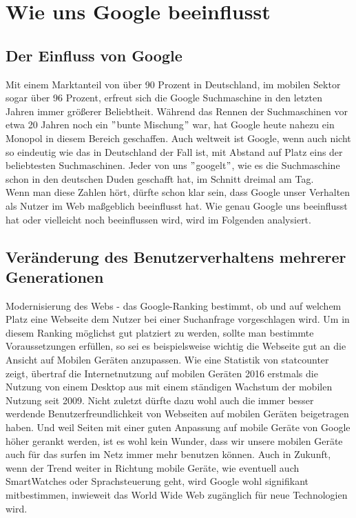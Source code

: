 \section{Wie uns Google beeinflusst}\label{sec:wie-uns-google-beeinflusst}

\subsection{Der Einfluss von Google}\label{subsec:der-einfluss-von-google}
Mit einem Marktanteil von über 90 Prozent in Deutschland, im mobilen Sektor sogar über 96 Prozent, erfreut sich die Google Suchmaschine in den letzten Jahren immer größerer Beliebtheit.
Während das Rennen der Suchmaschinen vor etwa 20 Jahren noch ein \("\)bunte Mischung\("\) war, hat Google heute nahezu ein Monopol in diesem Bereich geschaffen.
Auch weltweit ist Google, wenn auch nicht so eindeutig wie das in Deutschland der Fall ist, mit Abstand auf Platz eins der beliebtesten Suchmaschinen.
Jeder von uns \("\)googelt\("\)\cite{DUD22}, wie es die Suchmaschine schon in den deutschen Duden geschafft hat, im Schnitt dreimal am Tag.\cite{DOL22}\\
Wenn man diese Zahlen hört, dürfte schon klar sein, dass Google unser Verhalten als Nutzer im Web maßgeblich beeinflusst hat.
Wie genau Google uns beeinflusst hat oder vielleicht noch beeinflussen wird, wird im Folgenden analysiert.

\subsection{Veränderung des Benutzerverhaltens mehrerer Generationen}\label{subsec:veränderung-des-benutzerverhaltens-mehrerer-generationen}
Modernisierung des Webs - das Google-Ranking bestimmt, ob und auf welchem Platz eine Webseite dem Nutzer bei einer Suchanfrage vorgeschlagen wird.
Um in diesem Ranking möglichst gut platziert zu werden, sollte man bestimmte Voraussetzungen erfüllen, so sei es beispielsweise wichtig die Webseite gut an die Ansicht auf Mobilen Geräten anzupassen.\cite{BUI22}
Wie eine Statistik von statcounter zeigt, übertraf die Internetnutzung auf mobilen Geräten 2016 erstmals die Nutzung von einem Desktop aus mit einem ständigen Wachstum der mobilen Nutzung seit 2009.\cite{STA16}
Nicht zuletzt dürfte dazu wohl auch die immer besser werdende Benutzerfreundlichkeit von Webseiten auf mobilen Geräten beigetragen haben.
Und weil Seiten mit einer guten Anpassung auf mobile Geräte von Google höher gerankt werden, ist es wohl kein Wunder, dass wir unsere mobilen Geräte auch für das surfen im Netz immer mehr benutzen können.
Auch in Zukunft, wenn der Trend weiter in Richtung mobile Geräte, wie eventuell auch SmartWatches oder Sprachsteuerung geht,
wird Google wohl signifikant mitbestimmen, inwieweit das World Wide Web zugänglich für neue Technologien wird.\\


